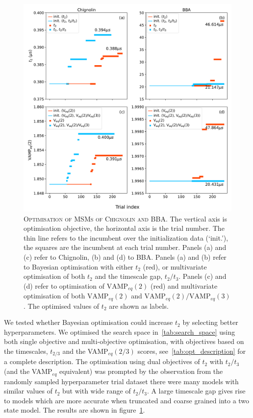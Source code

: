 \documentclass[journal=jacsat,manuscript=article]{achemso}
\begin{document}
\begin{figure}[h]
    \centering
    \includegraphics[width=\columnwidth]{results3/optimisation_summary.pdf}
    \caption{\textsc{Optimisation of MSMs of Chignolin and BBA}. The vertical axis is optimisation objective, the horizontal axis is the trial number. The thin line refers to the incumbent over the initialization data (`init.'), the squares are the incumbent at each trial number. Panels (a) and (c) refer to Chignolin, (b) and (d) to BBA. Panels (a) and (b) refer to Bayesian optimisation with either $t_{2}$  (red), or multivariate optimisation of both $t_{2}$ and the timescale gap, $t_{2}/t_{3}$.  Panels (c) and (d) refer to optimisation of  $\mathrm{VAMP}_{eq}(2)$ (red) and multivariate optimisation of both  $\mathrm{VAMP}_{eq}(2)$ and $\mathrm{VAMP}_{eq}(2)/\mathrm{VAMP}_{eq}(3)$. The optimised values of $t_2$ are shown as labels. }
    \label{fig:optimisation_trials}
\end{figure}

We tested whether Bayesian optimisation could increase $t_2$ by selecting better hyperparameters.  We optimised the search space in~\ref{tab:search_space} using both single objective and multi-objective optimisation, with objectives based on the timescales, $t_{2/3}$ and the VAMP$_{eq}(2/3)$ scores, see~\ref{tab:opt_description} for a complete description.  The optimisation using dual objectives of $t_2$ with $t_2/t_3$ (and the VAMP$_{eq}$ equivalent) was prompted by the observation from the randomly sampled hyperparameter trial dataset there were many models with similar values of $t_2$ but with wide range of $t_2/t_3$. A large timescale gap gives rise to models which are more accurate when truncated and coarse grained into a two state model. The results are shown in figure~\ref{fig:optimisation_trials}.  
\end{document}
